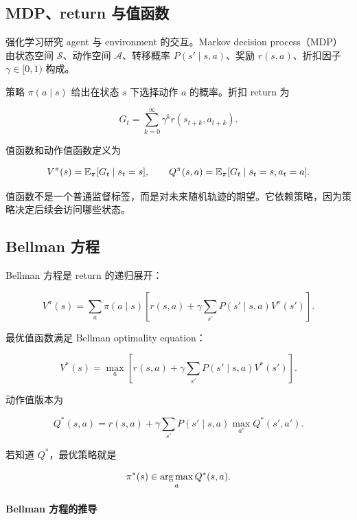 
\subsection{MDP、return 与值函数}


强化学习研究 agent 与 environment 的交互。Markov decision process（MDP）由状态空间 \(\mathcal{S}\)、动作空间 \(\mathcal{A}\)、转移概率 \(P(s'\mid s,a)\)、奖励 \(r(s,a)\)、折扣因子 \(\gamma\in[0,1)\) 构成。

策略 \(\pi(a\mid s)\) 给出在状态 \(s\) 下选择动作 \(a\) 的概率。折扣 return 为

\[
  G_t=\sum_{k=0}^{\infty}\gamma^k r(s_{t+k},a_{t+k}).
\]

值函数和动作值函数定义为

\[
  V^\pi(s)=\mathbb{E}_\pi[G_t\mid s_t=s],
  \qquad
  Q^\pi(s,a)=\mathbb{E}_\pi[G_t\mid s_t=s,a_t=a].
\]

值函数不是一个普通监督标签，而是对未来随机轨迹的期望。它依赖策略，因为策略决定后续会访问哪些状态。

\subsection{Bellman 方程}


Bellman 方程是 return 的递归展开：

\[
  V^\pi(s)
  =
  \sum_a\pi(a\mid s)
  \left[
    r(s,a)
    +
    \gamma
    \sum_{s'}P(s'\mid s,a)V^\pi(s')
  \right].
\]

最优值函数满足 Bellman optimality equation：

\[
  V^*(s)
  =
  \max_{a}
  \left[
    r(s,a)
    +
    \gamma
    \sum_{s'}P(s'\mid s,a)V^*(s')
  \right].
\]

动作值版本为

\[
  Q^*(s,a)
  =
  r(s,a)
  +
  \gamma
  \sum_{s'}P(s'\mid s,a)
  \max_{a'}Q^*(s',a').
\]

若知道 \(Q^*\)，最优策略就是

\[
  \pi^*(s)\in\operatorname*{arg\,max}_a Q^*(s,a).
\]

\paragraph{Bellman 方程的推导}

